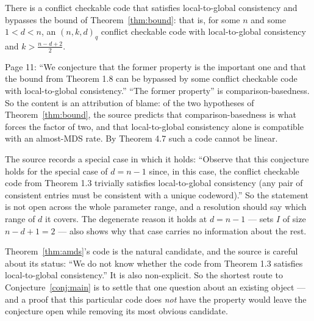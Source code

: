 \documentclass{aicr-conjecture}
\begin{document}
\begin{conjecture}[{\cite[\S 1.2]{AK23}}]\label{conj:main}
There is a conflict checkable code that satisfies local-to-global
consistency and bypasses the bound of Theorem~\ref{thm:bound}: that is,
for some $n$ and some $1 < d < n$, an $(n,k,d)_{q}$ conflict checkable
code with local-to-global consistency and $k > \frac{n-d+2}{2}$.
\end{conjecture}

\begin{remark}\label{rem:quote}
Page 11: ``We conjecture that the former property is the important one
and that the bound from Theorem 1.8 can be bypassed by some conflict
checkable code with local-to-global consistency.'' ``The former property''
is comparison-basedness. So the content is an attribution of blame: of
the two hypotheses of Theorem~\ref{thm:bound}, the source predicts that
comparison-basedness is what forces the factor of two, and that
local-to-global consistency alone is compatible with an almost-MDS rate.
By Theorem 4.7 such a code cannot be linear.
\end{remark}

\begin{remark}\label{rem:endpoint}
The source records a special case in which it holds: ``Observe that this
conjecture holds for the special case of $d = n-1$ since, in this case,
the conflict checkable code from Theorem 1.3 trivially satisfies
local-to-global consistency (any pair of consistent entries must be
consistent with a unique codeword).'' So the statement is not open across
the whole parameter range, and a resolution should say which range of $d$
it covers. The degenerate reason it holds at $d = n-1$ --- sets $I$ of size
$n-d+1 = 2$ --- also shows why that case carries no information about the
rest.
\end{remark}

\begin{remark}\label{rem:candidate}
Theorem~\ref{thm:amds}'s code is the natural candidate, and the source is
careful about its status: ``We do not know whether the code from
Theorem 1.3 satisfies local-to-global consistency.'' It is also
non-explicit. So the shortest route to Conjecture~\ref{conj:main} is to
settle that one question about an existing object --- and a proof that this
particular code does \emph{not} have the property would leave the
conjecture open while removing its most obvious candidate.
\end{remark}
\end{document}

